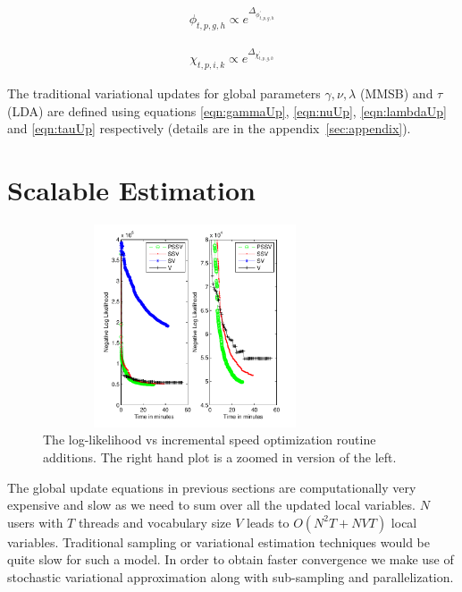 \documentclass{sig-alternate}
\begin{document}
\begin{align}
\phi_{t,p,g,h} \propto e^{\Delta_{\phi^{'}_{t,p,g,h}}}
\label{eqn:phiUp}
\end{align}



\begin{align}
\chi_{t,p,i,k} \propto e^{\Delta_{\chi^{'}_{t,p,g,h}}}
\label{eqn:chiUp}
\end{align}

The traditional variational updates for global parameters $\gamma, \nu, \lambda$
(MMSB) and $\tau$ (LDA) are defined using equations
\ref{eqn:gammaUp}, \ref{eqn:nuUp}, \ref{eqn:lambdaUp} and \ref{eqn:tauUp}
respectively (details are in the appendix~\ref{sec:appendix}).



\section{Scalable Estimation}
\label{estimation}

\begin{figure}
\begin{center}
\includegraphics[height=6cm,width=9cm]{SpeedOptimization.pdf}
\end{center}
\caption{The log-likelihood vs incremental speed optimization routine
additions. The right hand plot is a zoomed in version of the left.}
\label{fig:SpeedOptimization}
\end{figure}
The global update equations in previous sections are computationally
very expensive and slow as we need to sum over all the updated local
variables. $N$ users with $T$ threads and vocabulary size $V$ leads to
$O(N^2T+NVT)$ local variables. Traditional sampling or 
variational estimation techniques would be
quite slow for such a model. In order to obtain faster convergence we
make use of stochastic variational approximation along with
sub-sampling and parallelization. 
\end{document}
